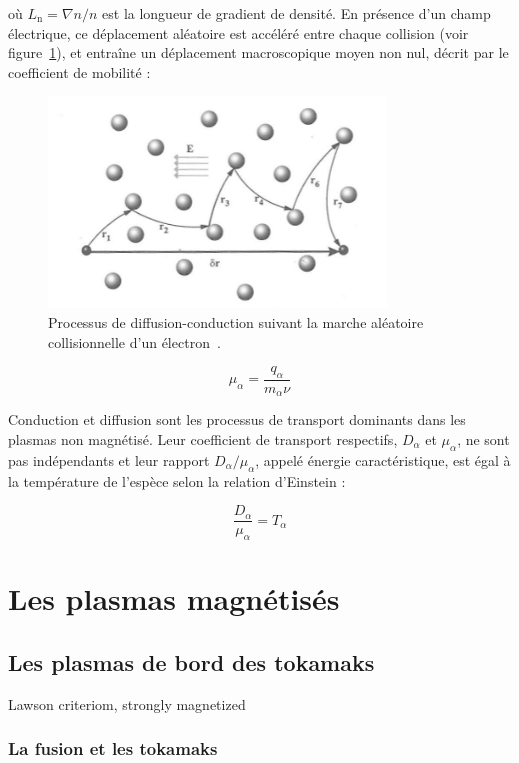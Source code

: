 \begin{refsection}
où $L_\text{n}=\nabla n/n$ est la longueur de gradient de densité. 
En présence d'un champ électrique, ce déplacement aléatoire est accéléré entre
chaque collision (voir figure~\ref{1-collisions}), et entraîne un déplacement
macroscopique moyen non nul, décrit par le coefficient de mobilité :
\begin{figure}
\centering
\includegraphics[width=0.8\textwidth]{figures/1-collisions.jpg}
{\caption{Processus de diffusion-conduction suivant la marche aléatoire
collisionnelle d'un électron~{\cite{Rax}}.}\label{1-collisions}}
\end{figure}
\begin{equation}
    \mu_\alpha=\frac{q_\alpha}{m_\alpha\nu}
\end{equation}
 
Conduction et diffusion sont les processus de transport dominants dans les
plasmas non magnétisé. Leur coefficient de transport respectifs, $D_\alpha$ et
$\mu_\alpha$, ne sont pas indépendants et leur rapport $D_\alpha/\mu_\alpha$,
appelé énergie caractéristique, est égal à la température de l'espèce selon la relation
d'Einstein :
 
\begin{equation}
    \frac{D_\alpha}{\mu_\alpha}=T_\alpha
\end{equation}
 
\section{Les plasmas magnétisés}


\subsection{Les plasmas de bord des tokamaks}
Lawson criteriom, strongly magnetized
\subsubsection{La fusion et les tokamaks}

\end{refsection}
